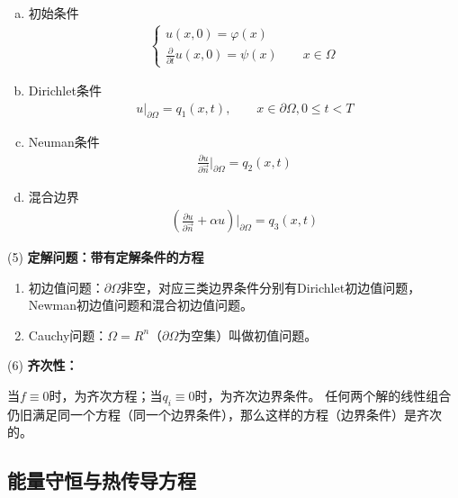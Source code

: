 \documentclass[11pt, a4paper]{article}
\theoremstyle{theorem}
\begin{document}
\begin{enumerate}[(a)]
  \item 初始条件
  \begin{align*}
    \begin{cases}
    u(x,0) = \varphi(x) \\
    \frac{\partial }{\partial t} u(x, 0) = \psi(x) \quad \quad x \in \Omega
    \end{cases}
  \end{align*}
  \item Dirichlet条件
  \begin{align*}
      u|_{\partial \Omega} = q_1(x,t), \quad \quad x \in \partial \Omega, 0 \leq t < T
  \end{align*}
  \item Neuman条件
    \begin{align*}
      \frac{\partial u}{\partial \vec{n}}|_{\partial \Omega} = q_2(x,t)
  \end{align*}
  \item 混合边界
    \begin{align*}
      \left(\frac{\partial u}{\partial \vec{n}} + \alpha u\right)|_{\partial \Omega} = q_3(x,t)
  \end{align*}
\end{enumerate}

(5) \textbf{定解问题：带有定解条件的方程}

\begin{enumerate}
  \item 初边值问题：$\partial \Omega$非空，对应三类边界条件分别有Dirichlet初边值问题，Newman初边值问题和混合初边值问题。
  \item Cauchy问题：$\Omega = R^n$（$\partial \Omega$为空集）叫做初值问题。
\end{enumerate}

(6) \textbf{齐次性：}

当$f \equiv 0$时，为齐次方程；当$q_i \equiv 0$时，为齐次边界条件。 任何两个解的线性组合仍旧满足同一个方程（同一个边界条件），那么这样的方程（边界条件）是齐次的。

\subsection{能量守恒与热传导方程}
\end{document}
